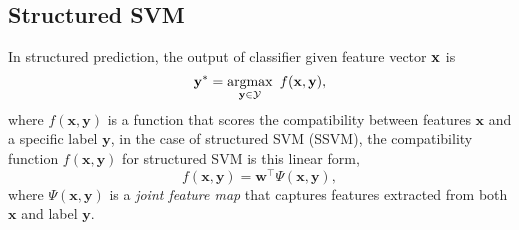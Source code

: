 

\subsection{Structured SVM}
\label{ssec:ssvm}

In structured prediction, the output of classifier given feature vector $\mathbf{x}$ is
\begin{equation*}
\mathbf{y}^* = \operatorname*{argmax}_{\mathbf{y} \in \mathcal{Y}}~ f(\mathbf{x}, \mathbf{y}),
\end{equation*}
where $f(\mathbf{x}, \mathbf{y})$ is a function that scores the compatibility between features $\mathbf{x}$ and a specific label $\mathbf{y}$,
in the case of structured SVM (SSVM), the compatibility function $f(\mathbf{x}, \mathbf{y})$ for structured SVM is this linear form,
\begin{equation*}
f(\mathbf{x}, \mathbf{y}) = \mathbf{w}^\top \Psi(\mathbf{x}, \mathbf{y}),
\end{equation*}
where $\Psi(\mathbf{x}, \mathbf{y})$ is a \emph{joint feature map} 
that captures features extracted from both $\mathbf{x}$ and label $\mathbf{y}$.

